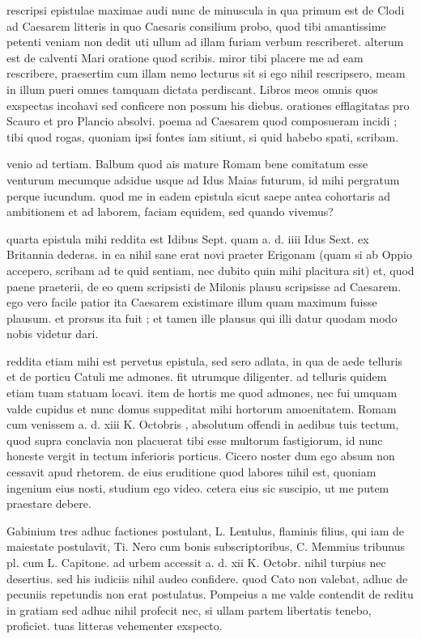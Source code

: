  rescripsi epistulae maximae audi nunc de minuscula in qua primum est de Clodi ad Caesarem litteris in quo Caesaris consilium probo, quod tibi amantissime petenti veniam non dedit uti ullum ad illam furiam verbum rescriberet. alterum est de calventi Mari oratione quod scribis. miror tibi placere me ad eam rescribere, praesertim cum illam nemo lecturus sit si ego nihil rescripsero, meam in illum pueri omnes tamquam dictata perdiscant. Libros meos omnis quos exspectas incohavi sed conficere non possum his diebus. orationes efflagitatas pro Scauro et pro Plancio absolvi. poema ad Caesarem quod composueram incidi ; tibi quod rogas, quoniam ipsi fontes iam sitiunt, si quid habebo spati, scribam.

 venio ad tertiam. Balbum quod ais mature Romam bene comitatum esse venturum mecumque adsidue usque ad Idus Maias futurum, id mihi pergratum perque iucundum. quod me in eadem epistula sicut saepe antea cohortaris ad ambitionem et ad laborem, faciam equidem, sed quando vivemus?

 quarta epistula mihi reddita est Idibus Sept. quam a. d. iiii Idus Sext. ex Britannia dederas. in ea nihil sane erat novi praeter Erigonam (quam si ab Oppio accepero, scribam ad te quid sentiam, nec dubito quin mihi placitura sit) et, quod paene praeterii, de eo quem scripsisti de Milonis plausu scripsisse ad Caesarem. ego vero facile patior ita Caesarem existimare illum quam maximum fuisse plausum. et prorsus ita fuit ; et tamen ille plausus qui illi datur quodam modo nobis videtur dari.

 reddita etiam mihi est pervetus epistula, sed sero adlata, in qua de aede telluris et de porticu Catuli me admones. fit utrumque diligenter. ad telluris quidem etiam tuam statuam locavi. item de hortis me quod admones, nec fui umquam valde cupidus et nunc domus suppeditat mihi hortorum amoenitatem. Romam cum venissem a. d. xiii K. Octobris , absolutum offendi in aedibus tuis tectum, quod supra conclavia non placuerat tibi esse multorum fastigiorum, id nunc honeste vergit in tectum inferioris porticus. Cicero noster dum ego absum non cessavit apud rhetorem. de eius eruditione quod labores nihil est, quoniam ingenium eius nosti, studium ego video. cetera eius sic suscipio, ut me putem praestare debere.

 Gabinium tres adhuc factiones postulant, L. Lentulus, flaminis filius, qui iam de maiestate postulavit, Ti. Nero cum bonis subscriptoribus, C. Memmius tribunus pl. cum L. Capitone. ad urbem accessit a. d. xii K. Octobr. nihil turpius nec desertius. sed his iudiciis nihil audeo confidere. quod Cato non valebat, adhuc de pecuniis repetundis non erat postulatus. Pompeius a me valde contendit de reditu in gratiam sed adhuc nihil profecit nec, si ullam partem libertatis tenebo, proficiet. tuas litteras vehementer exspecto.

